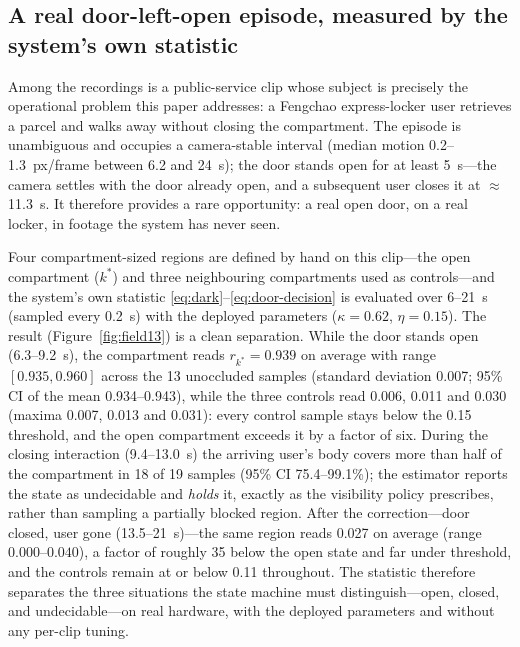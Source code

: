 \documentclass[journal,article,submit,oneauthor]{Definitions/mdpi}
\begin{document}
\subsection{A real door-left-open episode, measured by the system's own statistic}
\label{sec:field-door}
Among the recordings is a public-service clip whose subject is precisely the operational
problem this paper addresses: a Fengchao express-locker user retrieves a parcel and walks
away without closing the compartment. The episode is unambiguous and occupies a
camera-stable interval (median motion 0.2--1.3~px/frame between 6.2 and 24~s); the door
stands open for at least 5~s---the camera settles with the door already open, and a
subsequent user closes it at $\approx$11.3~s. It therefore provides a rare opportunity: a
real open door, on a real locker, in footage the system has never seen.

Four compartment-sized regions are defined by hand on this clip---the open compartment
($k^\ast$) and three neighbouring compartments used as controls---and the system's own
statistic \eqref{eq:dark}--\eqref{eq:door-decision} is evaluated over 6--21~s (sampled
every 0.2~s) with the deployed parameters ($\kappa=0.62$, $\eta=0.15$). The result
(Figure~\ref{fig:field13}) is a clean separation. While the door stands open
(6.3--9.2~s), the compartment reads $r_{k^\ast}=0.939$ on average with range
$[0.935,0.960]$ across the 13 unoccluded samples (standard deviation 0.007; 95\% CI of the
mean 0.934--0.943), while the three controls read 0.006, 0.011 and
0.030 (maxima 0.007, 0.013 and 0.031): every control sample stays below the 0.15
threshold, and the open compartment exceeds it by a factor of six. During the closing
interaction (9.4--13.0~s) the arriving user's body covers more than half of the
compartment in 18 of 19 samples (95\% CI 75.4--99.1\%); the estimator reports the state as
undecidable and
\emph{holds} it, exactly as the visibility policy prescribes, rather than sampling a
partially blocked region. After the correction---door closed, user gone
(13.5--21~s)---the same region reads 0.027 on average (range $0.000$--$0.040$), a factor
of roughly 35 below the open state and far under threshold, and the controls remain at or
below 0.11 throughout. The statistic therefore separates the three situations the state
machine must distinguish---open, closed, and undecidable---on real hardware, with the
deployed parameters and without any per-clip tuning.
\end{document}
